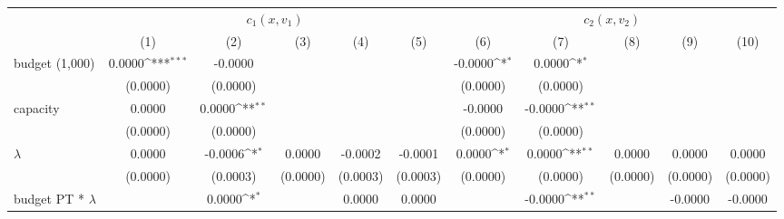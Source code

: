 {
\def\sym#1{\ifmmode^{#1}\else\(^{#1}\)\fi}
\begin{tabular}{l*{10}{c}}
\hline\hline
                    &\multicolumn{5}{c}{$ c_{1}(x,v_{1})$}                                                                        &\multicolumn{5}{c}{$ c_{2}(x,v_{2})$}                                                                        \\\cmidrule(lr){2-6}\cmidrule(lr){7-11}
                    &\multicolumn{1}{c}{(1)}         &\multicolumn{1}{c}{(2)}         &\multicolumn{1}{c}{(3)}         &\multicolumn{1}{c}{(4)}         &\multicolumn{1}{c}{(5)}         &\multicolumn{1}{c}{(6)}         &\multicolumn{1}{c}{(7)}         &\multicolumn{1}{c}{(8)}         &\multicolumn{1}{c}{(9)}         &\multicolumn{1}{c}{(10)}         \\
\hline
budget (1,000)      &      0.0000\sym{***}&     -0.0000         &                     &                     &                     &     -0.0000\sym{*}  &      0.0000\sym{*}  &                     &                     &                     \\
                    &    (0.0000)         &    (0.0000)         &                     &                     &                     &    (0.0000)         &    (0.0000)         &                     &                     &                     \\
[1em]
capacity            &      0.0000         &      0.0000\sym{**} &                     &                     &                     &     -0.0000         &     -0.0000\sym{**} &                     &                     &                     \\
                    &    (0.0000)         &    (0.0000)         &                     &                     &                     &    (0.0000)         &    (0.0000)         &                     &                     &                     \\
[1em]
$\lambda$           &      0.0000         &     -0.0006\sym{*}  &      0.0000         &     -0.0002         &     -0.0001         &      0.0000\sym{*}  &      0.0000\sym{**} &      0.0000         &      0.0000         &      0.0000         \\
                    &    (0.0000)         &    (0.0003)         &    (0.0000)         &    (0.0003)         &    (0.0003)         &    (0.0000)         &    (0.0000)         &    (0.0000)         &    (0.0000)         &    (0.0000)         \\
[1em]
budget PT * $\lambda$&                     &      0.0000\sym{*}  &                     &      0.0000         &      0.0000         &                     &     -0.0000\sym{**} &                     &     -0.0000         &     -0.0000         \\

\end{tabular}}
